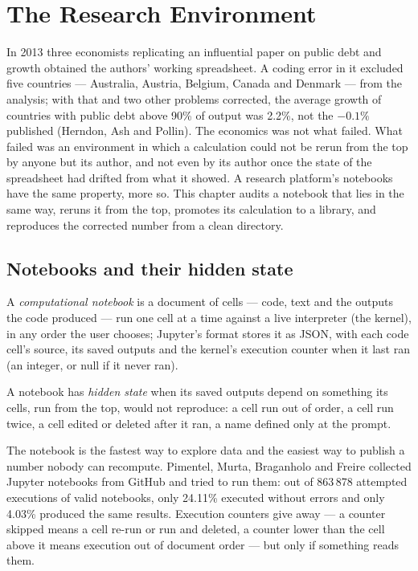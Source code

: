 \chapter{The Research Environment}\label{ch:pl:the-research-environment}

In 2013 three economists replicating an influential paper on public debt and growth obtained the authors' working spreadsheet. A coding
error in it excluded five countries --- Australia, Austria, Belgium, Canada and Denmark --- from the analysis; with that and two other
problems corrected, the average growth of countries with public debt above 90\% of output was 2.2\%, not the $-0.1\%$ published (Herndon,
Ash and Pollin). The economics was not what failed. What failed was an environment in which a calculation could not be rerun from the top
by anyone but its author, and not even by its author once the state of the spreadsheet had drifted from what it showed. A research
platform's notebooks have the same property, more so. This chapter audits a notebook that lies in the same way, reruns it from the top,
promotes its calculation to a library, and reproduces the corrected number from a clean directory.

\section{Notebooks and their hidden state}

\begin{definition}\label{def:pl:the-research-environment:notebook}
A \emph{computational notebook} is a document of cells --- code, text and the outputs the code produced ---
run one cell at a time against a live interpreter (the kernel), in any order the user chooses; Jupyter's format stores it as JSON, with each
code cell's source, its saved outputs and the kernel's execution counter when it last ran (an integer, or null if it never ran).
\end{definition}

\begin{definition}\label{def:pl:the-research-environment:hidden}
A notebook has \emph{hidden state} when its saved outputs depend on something its cells, run from the top, would not
reproduce: a cell run out of order, a cell run twice, a cell edited or deleted after it ran, a name defined only at the prompt.
\end{definition}

The notebook is the fastest way to explore data and the easiest way to publish a number nobody can recompute. Pimentel, Murta, Braganholo and
Freire collected Jupyter notebooks from GitHub and tried to run them: out of 863\,878 attempted executions of valid notebooks, only 24.11\%
executed without errors and only 4.03\% produced the same results. Execution counters give  away --- a counter skipped means a
cell re-run or run and deleted, a counter lower than the cell above it means execution out of document order --- but only if something reads
them.

